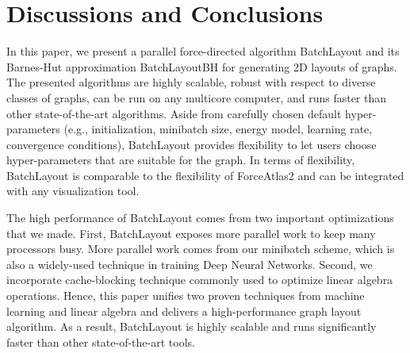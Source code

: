 \documentclass{vgtc}
\newcommand{\toolname}{{BatchLayout}}
\newcommand{\toolnameBH}{{BatchLayoutBH}}
\begin{document}
\section{Discussions and Conclusions}
In this paper, we present a parallel force-directed algorithm \toolname{} and its Barnes-Hut approximation  \toolnameBH{} for generating 2D layouts of graphs. 
The presented algorithms are highly scalable, robust with respect to diverse classes of graphs, can be run on any multicore computer, and runs faster than other state-of-the-art algorithms. 
Aside from carefully chosen default hyper-parameters (e.g., initialization, minibatch size, energy model, learning rate, convergence conditions), \toolname{} provides flexibility to let users choose hyper-parameters that are suitable for the graph.
In terms of flexibility, \toolname{} is comparable to the flexibility of ForceAtlas2 and can be integrated with any visualization tool. 

The high performance of \toolname{} comes from two important optimizations that we made. 
First, \toolname{} exposes more parallel work to keep many processors busy. 
More parallel work comes from our minibatch scheme, which is also a widely-used technique in training Deep Neural Networks. 
Second, we incorporate cache-blocking technique commonly used to optimize linear algebra operations.
Hence, this paper unifies two proven techniques from machine learning and linear algebra and delivers a high-performance graph layout algorithm.
As a result, \toolname{} is highly scalable and runs significantly faster than other state-of-the-art tools. 



\end{document}
